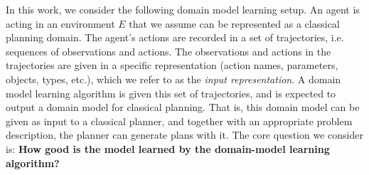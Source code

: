 \documentclass{article}
\theoremstyle{definition}
\theoremstyle{remark}
\newcommand{\realm}{{\ensuremath{M^*}}\xspace}
\newif\ifaddcomments
\newcommand{\roni}[1]{\ifaddcomments{\textcolor{red}{[Roni: #1]}}\fi}
\newcommand{\mauro}[1]{\ifaddcomments{\textcolor{green}{[Mauro: #1]}}\fi}
\newcommand{\gregor}[1]{\ifaddcomments{\textcolor{orange}{[Gregor: #1]}}\fi}
\begin{document}
In this work, we consider the following domain model learning setup. 
An agent is acting in an environment $E$ that we assume can be represented as a classical planning domain. 
The agent's actions are recorded in a set of trajectories, i.e. sequences of observations and actions. 
The observations and actions in the trajectories are given in a specific representation (action names, parameters, objects, types, etc.), which we refer to as the \emph{input representation}. 
A domain model learning algorithm is given this set of trajectories, and is expected to output a domain model for classical planning. 
That is, this domain model can be given as input to a classical planner, and together with an appropriate problem description, the planner can generate plans with it.
The core question we consider is: \textbf{How good is the model learned by the domain-model learning algorithm?}
\end{document}
